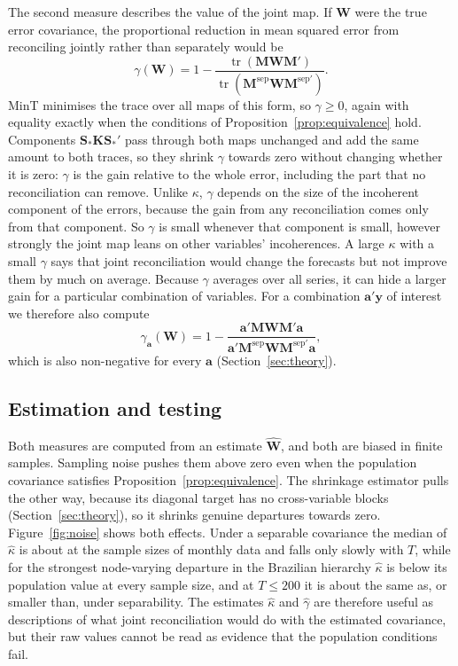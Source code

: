 The second measure describes the value of the joint map. If $\bm{W}$ were the true error covariance, the proportional reduction in mean squared error from reconciling jointly rather than separately would be
\begin{equation}\label{eq:gain}
  \gamma(\bm{W}) = 1 - \frac{\operatorname{tr}(\bm{M}\bm{W}\bm{M}')}{\operatorname{tr}(\bm{M}^{\mathrm{sep}}\bm{W}\bm{M}^{\mathrm{sep}\prime})}.
\end{equation}
MinT minimises the trace over all maps of this form, so $\gamma \ge 0$, again with equality exactly when the conditions of Proposition~\ref{prop:equivalence} hold. Components $\bm{S}_*\bm{K}\bm{S}_*'$ pass through both maps unchanged and add the same amount to both traces, so they shrink $\gamma$ towards zero without changing whether it is zero: $\gamma$ is the gain relative to the whole error, including the part that no reconciliation can remove. Unlike $\kappa$, $\gamma$ depends on the size of the incoherent component of the errors, because the gain from any reconciliation comes only from that component. So $\gamma$ is small whenever that component is small, however strongly the joint map leans on other variables' incoherences. A large $\kappa$ with a small $\gamma$ says that joint reconciliation would change the forecasts but not improve them by much on average. Because $\gamma$ averages over all series, it can hide a larger gain for a particular combination of variables. For a combination $\bm{a}'\bm{y}$ of interest we therefore also compute
\begin{equation}\label{eq:gain-a}
  \gamma_{\bm{a}}(\bm{W}) = 1 - \frac{\bm{a}'\bm{M}\bm{W}\bm{M}'\bm{a}}{\bm{a}'\bm{M}^{\mathrm{sep}}\bm{W}\bm{M}^{\mathrm{sep}\prime}\bm{a}},
\end{equation}
which is also non-negative for every $\bm{a}$ (Section~\ref{sec:theory}).

\subsection{Estimation and testing}

Both measures are computed from an estimate $\widehat{\bm{W}}$, and both are biased in finite samples. Sampling noise pushes them above zero even when the population covariance satisfies Proposition~\ref{prop:equivalence}. The shrinkage estimator pulls the other way, because its diagonal target has no cross-variable blocks (Section~\ref{sec:theory}), so it shrinks genuine departures towards zero. Figure~\ref{fig:noise} shows both effects. Under a separable covariance the median of $\widehat\kappa$ is about \kappaNoiseSep{} at the sample sizes of monthly data and falls only slowly with $T$, while for the strongest node-varying departure in the Brazilian hierarchy $\widehat\kappa$ is below its population value at every sample size, and at $T \le 200$ it is about the same as, or smaller than, under separability. The estimates $\widehat\kappa$ and $\widehat\gamma$ are therefore useful as descriptions of what joint reconciliation would do with the estimated covariance, but their raw values cannot be read as evidence that the population conditions fail.

